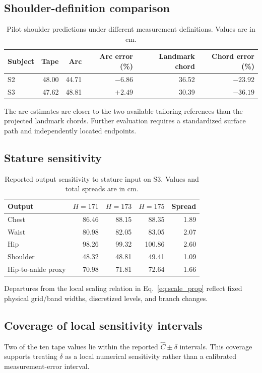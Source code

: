 \documentclass[11pt,a4paper]{article}
\numberwithin{equation}{section}
\begin{document}
\subsection{Shoulder-definition comparison}
\begin{table}[htbp]
\centering\small
\caption{Pilot shoulder predictions under different measurement definitions. Values are in cm.}
\label{tab:shoulder_comparison}
\begin{tabular}{lrrrrr}
\toprule
Subject & Tape & Arc & Arc error (\%) & Landmark chord & Chord error (\%) \\
\midrule
S2 & 48.00 & 44.71 & $-6.86$ & 36.52 & $-23.92$ \\
S3 & 47.62 & 48.81 & $+2.49$ & 30.39 & $-36.19$ \\
\bottomrule
\end{tabular}
\end{table}
The arc estimates are closer to the two available tailoring references than the projected landmark chords. Further evaluation requires a standardized surface path and independently located endpoints.

\subsection{Stature sensitivity}
\begin{table}[htbp]
\centering\small
\caption{Reported output sensitivity to stature input on S3. Values and total spreads are in cm.}
\label{tab:stature_pert}
\begin{tabular}{lrrrr}
\toprule
Output & $H=171$ & $H=173$ & $H=175$ & Spread \\
\midrule
Chest & 86.46 & 88.15 & 88.35 & 1.89 \\
Waist & 80.98 & 82.05 & 83.05 & 2.07 \\
Hip & 98.26 & 99.32 & 100.86 & 2.60 \\
Shoulder & 48.32 & 48.81 & 49.41 & 1.09 \\
Hip-to-ankle proxy & 70.98 & 71.81 & 72.64 & 1.66 \\
\bottomrule
\end{tabular}
\end{table}
Departures from the local scaling relation in Eq.~\eqref{eq:scale_prop} reflect fixed physical grid/band widths, discretized levels, and branch changes.



\subsection{Coverage of local sensitivity intervals}
Two of the ten tape values lie within the reported $\hat C\pm\delta$ intervals. This coverage supports treating $\delta$ as a local numerical sensitivity rather than a calibrated measurement-error interval.
\end{document}
